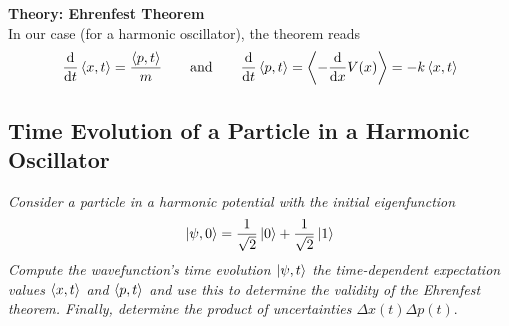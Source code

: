 \documentclass[11pt, a4paper]{article}
\newcommand{\eqtext}[1]{\qquad \text{#1} \qquad}
\begin{document}
\textbf{Theory: Ehrenfest Theorem}\\
In our case (for a harmonic oscillator), the theorem reads
\begin{equation*}
	\dv{t}\ev{x, t} = \frac{\ev{p, t}}{m} \eqtext{and} \dv{t}\ev{p, t} = \ev{-\dv{x}V(x)} = -k\ev{x, t}
\end{equation*}


\subsection{Time Evolution of a Particle in a Harmonic Oscillator}
\textit{Consider a particle in a harmonic potential with the initial eigenfunction}
\begin{equation*}
	\ket{\psi, 0} = \frac{1}{\sqrt{2}}\ket{0} + \frac{1}{\sqrt{2}}\ket{1}
\end{equation*}
\textit{Compute the wavefunction's time evolution $ \ket{\psi, t} $ the time-dependent expectation values $ \ev{x, t} $ and $ \ev{p, t} $ and use this to determine the validity of the Ehrenfest theorem. Finally, determine the product of uncertainties $ \Delta x(t) \Delta p(t) $}.
\end{document}
